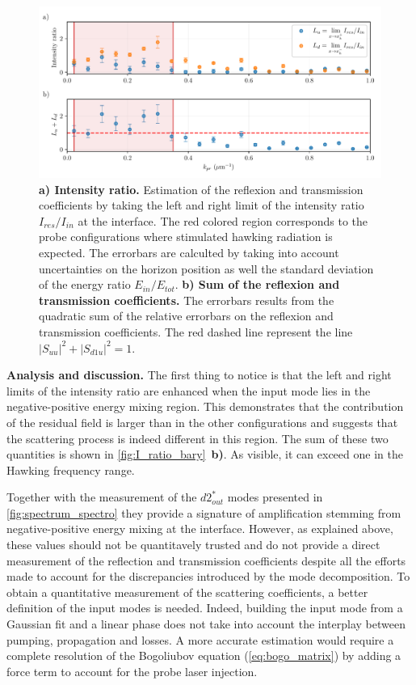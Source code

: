 \begin{figure}
    \centering
    \includegraphics[width=1\textwidth]{chap_stimulated_hawking/fig/I_ratio_bary.pdf}
    \caption{\textbf{a) Intensity ratio.} Estimation of the reflexion and transmission coefficients by taking the left and right limit of the intensity ratio $I_{res}/I_{in}$ at the interface. 
    The red colored region corresponds to the probe configurations where stimulated hawking radiation is expected. The errorbars are calculted by taking into account uncertainties on the horizon position as well the standard deviation of the energy ratio $E_{in}/E_{tot}$.
    \textbf{b) Sum of the reflexion and transmission coefficients.} The errorbars results from the quadratic sum of the relative errorbars on the reflexion and transmission coefficients. The red dashed line represent the line $|S_{uu}|^2+|S_{d1u}|^2=1$.}
    \label{fig:I_ratio_bary}
\end{figure}


\textbf{Analysis and discussion.} The first thing to notice is that the left and right limits of the intensity ratio are enhanced when the input mode lies in the negative-positive energy mixing region. This demonstrates that the contribution of the residual field is larger than in the other configurations and suggests that the scattering process is indeed different in this region. The sum of these two quantities is shown in \autoref{fig:I_ratio_bary}~\textbf{b)}. As visible,
it can exceed one in the Hawking frequency range.

Together with the measurement of the $d2^*_{out}$ modes presented in \autoref{fig:spectrum_spectro} they provide a signature of amplification stemming from negative-positive energy mixing at the interface. However, as explained above, these values should not be quantitavely trusted and do not provide a direct measurement of the reflection and transmission coefficients despite all the efforts made to account for the discrepancies introduced by the mode decomposition.
To obtain a quantitative measurement of the scattering coefficients, a better definition of the input modes is needed. Indeed, building the input mode from a Gaussian fit and a linear phase does not take into account the interplay between pumping, propagation and losses. A more accurate estimation would require a complete resolution of the Bogoliubov equation (\ref{eq:bogo_matrix}) by adding a force term to account for the probe laser injection. 


